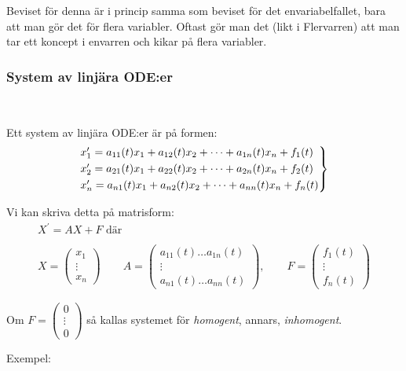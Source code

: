 \par\bigskip
\noindent Beviset för denna är i princip samma som beviset för det envariabelfallet, bara att man gör det för flera variabler. Oftast gör man det (likt i Flervarren) att man tar ett koncept i envarren och kikar på flera variabler.
\par\bigskip
\subsubsection{System av linjära ODE:er}\hfill\\
\par\bigskip
\noindent Ett system av linjära ODE:er är på formen:
\begin{equation*}
  \begin{gathered}
    \begin{rcases*}
      x_1^{\prime} = a_{11}(t)x_1+a_{12}(t)x_2+\cdots+a_{1n}(t)x_n+f_1(t)\\
      x_2^{\prime} = a_{21}(t)x_1+a_{22}(t)x_2+\cdots+a_{2n}(t)x_n+f_2(t)\\
      x_n^{\prime} = a_{n1}(t)x_1+a_{n2}(t)x_2+\cdots+a_{nn}(t)x_n+f_n(t)
    \end{rcases*}
  \end{gathered}
\end{equation*}
\par\bigskip
\noindent Vi kan skriva detta på matrisform:
\begin{equation*}
  \begin{gathered}
    X^{\prime} = AX+F \text{ där }\\\\
    X=\begin{pmatrix}x_1\\\vdots\\x_n\end{pmatrix}\qquad A = \begin{pmatrix}a_{11}(t)\hdots a_{1n}(t)\\\vdots\\a_{n1}(t)\hdots a_{nn}(t)\end{pmatrix},\qquad F=\begin{pmatrix}f_1(t)\\\vdots\\f_n(t)\end{pmatrix}
  \end{gathered}
\end{equation*}
\par\bigskip
\noindent Om $F=\begin{pmatrix}0\\\vdots\\0\end{pmatrix}$ så kallas systemet för \textit{homogent}, annars, \textit{inhomogent}.
\par\bigskip
\noindent Exempel:\par


